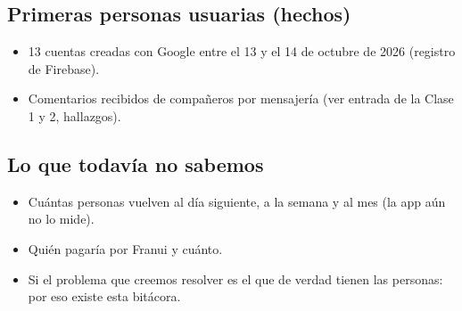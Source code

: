 \documentclass[11pt,a4paper]{article}
\begin{document}
\subsection*{Primeras personas usuarias (hechos)}
\begin{itemize}
  \item 13 cuentas creadas con Google entre el 13 y el 14 de octubre de 2026 (registro de Firebase).
  \item Comentarios recibidos de compañeros por mensajería (ver entrada de la Clase 1 y 2, hallazgos).
\end{itemize}

\subsection*{Lo que todavía no sabemos}
\begin{itemize}
  \item Cuántas personas vuelven al día siguiente, a la semana y al mes (la app aún no lo mide).
  \item Quién pagaría por Franui y cuánto.
  \item Si el problema que creemos resolver es el que de verdad tienen las personas: por eso existe esta bitácora.
\end{itemize}




\end{document}
